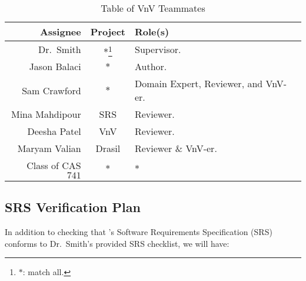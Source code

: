 \documentclass[12pt, titlepage]{article}
\begin{document}
\begin{longtable}{|r|c|l|}
    \caption{Table of VnV Teammates}
    \label{table:vnv_teammates}

    \\ \hline
    \rowcolor{Maroon}
    \textbf{Assignee}    & \textbf{Project}                  & \textbf{Role(s)}                                              \\ \hline
    \rowcolor{White}
    Dr.\ Smith           & \(*\)\footnote{\(*\): match all.} & Supervisor.                                                   \\ \hline
    Jason Balaci         & \(*\)                             & Author.                                                       \\ \hline
    Sam Crawford         & \(*\)                             & Domain Expert, Reviewer, and VnV-er.                          \\ \hline
    Mina Mahdipour       & SRS                               & Reviewer.                                                     \\ \hline
    Deesha Patel         & VnV                               & Reviewer.                                                     \\ \hline
    Maryam Valian        & Drasil                            & Reviewer \& VnV-er.                                           \\ \hline
    Class of CAS \(741\) & \(*\)                             & \(*\)                                                         \\ \hline
\end{longtable}

\subsection{SRS Verification Plan}
\label{srs-verification-plan}

In addition to checking that \progname{}'s Software Requirements Specification
(SRS) conforms to Dr.\ Smith's provided SRS checklist, we will have:
\end{document}
